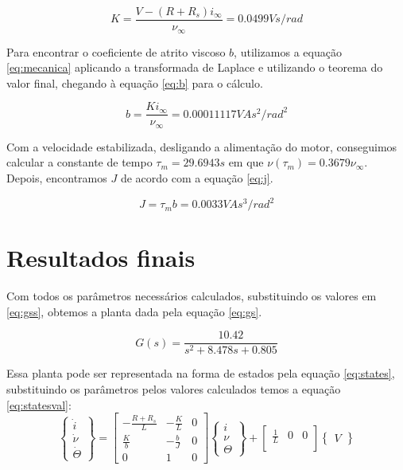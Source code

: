 \documentclass{article}
\begin{document}
\begin{equation}
\label{eq:k}
K=\frac{V-(R+R_s)i_{\infty}}{\nu_{\infty}}=0.0499Vs/rad
\end{equation}

Para encontrar o coeficiente de atrito viscoso $b$, utilizamos a equação \ref{eq:mecanica} aplicando a transformada de Laplace e utilizando o teorema do valor final, chegando à equação \ref{eq:b} para o cálculo.

\begin{equation}
\label{eq:b}
b=\frac{Ki_{\infty}}{\nu_{\infty}}=0.00011117VAs^2/rad^2
\end{equation}

Com a velocidade estabilizada, desligando a alimentação do motor, conseguimos calcular a constante de tempo $\tau_m=29.6943s$ em que $\nu(\tau_m)=0.3679\nu_{\infty}$. Depois, encontramos $J$ de acordo com a equação \ref{eq:j}.

\begin{equation}
\label{eq:j}
J=\tau_mb=0.0033VAs^3/rad^2
\end{equation}

\section{Resultados finais}
Com todos os parâmetros necessários calculados, substituindo os valores em \ref{eq:gss}, obtemos a planta dada pela equação \ref{eq:gs}.

\begin{equation}
\label{eq:gs}
G(s)=\frac{10.42}{s^2 + 8.478s + 0.805}
\end{equation}

Essa planta pode ser representada na forma de estados pela equação \ref{eq:states}, substituindo os parâmetros pelos valores calculados temos a equação \ref{eq:statesval}:
\begin{equation}
\label{eq:states}
\begin{Bmatrix}
\dot{i}\\ \dot{\nu} \\ \dot{\Theta} 
\end{Bmatrix} =
\begin{bmatrix}
-\frac{R+R_s}{L} & -\frac{K}{L} & 0\\
\frac{K}{b} & -\frac{b}{J} & 0\\
0 & 1 & 0
\end{bmatrix}
\begin{Bmatrix}
i\\ \nu \\ \Theta 
\end{Bmatrix} + 
\begin{bmatrix}
\frac{1}{L} & 0 & 0\\
\end{bmatrix}
\begin{Bmatrix}
V 
\end{Bmatrix}
\end{equation}
\end{document}
